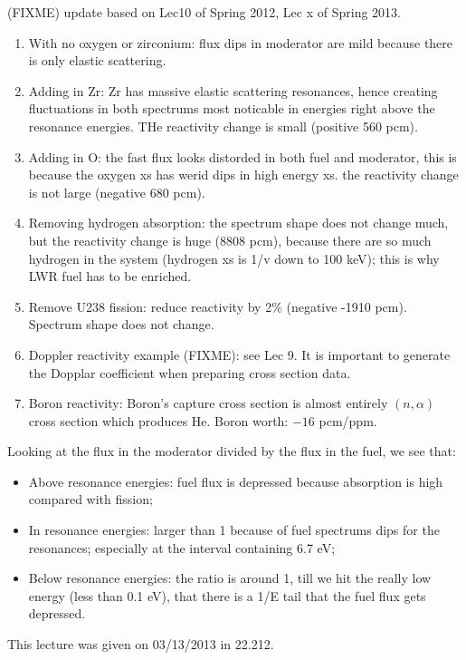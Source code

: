 \documentclass{school-22.211-notes}
\begin{document}
\clearpage
{}
(FIXME) update based on Lec10 of Spring 2012, Lec x of Spring 2013. 
\begin{enumerate}
\item With no oxygen or zirconium: flux dips in moderator are mild because there is only elastic scattering. 
\item Adding in Zr: Zr has massive elastic scattering resonances, hence creating fluctuations in both spectrums most noticable in energies right above the resonance energies. THe reactivity change is small (positive 560 pcm).
\item Adding in O: the fast flux looks distorded in both fuel and moderator, this is because the oxygen xs has werid dips in high energy xs. the reactivity change is not large (negative 680 pcm). 
\item Removing hydrogen absorption: the spectrum shape does not change much, but the reactivity change is huge (8808 pcm), because there are so much hydrogen in the system (hydrogen xs is 1/v down to 100 keV); this is why LWR fuel has to be enriched. 
\item Remove U238 fission: reduce reactivity by 2\% (negative -1910 pcm). Spectrum shape does not change. 
\item Doppler reactivity example (FIXME): see Lec 9. It is important to generate the Dopplar coefficient when preparing cross section data. 
\item Boron reactivity: Boron's capture cross section is almost entirely $(n,\alpha)$ cross section which produces He. Boron worth: $-16$ pcm/ppm. 
\end{enumerate}
Looking at the flux in the moderator divided by the flux in the fuel, we see that:
\begin{itemize}
\item Above resonance energies: fuel flux is depressed because absorption is high compared with fission; 
\item In resonance energies: larger than 1 because of fuel spectrums dips for the resonances; especially at the interval containing 6.7 eV;
\item Below resonance energies: the ratio is around 1, till we hit the really low energy (less than 0.1 eV), that there is a 1/E tail that the fuel flux gets depressed. 
\end{itemize}



\clearpage
{} %
This lecture was given on 03/13/2013 in 22.212. 
\end{document}
